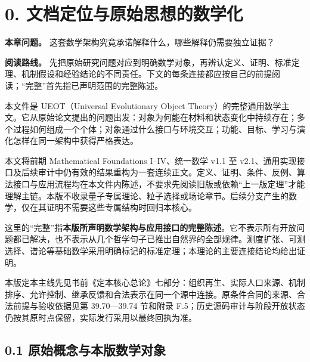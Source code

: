 \documentclass[
  11pt,
  oneside]{book}
\begin{document}
\chapter{0. 文档定位与原始思想的数学化}\label{ch-0}

\textbf{本章问题。} 这套数学架构究竟承诺解释什么，哪些解释仍需要独立证据？

\textbf{阅读路线。} 先把原始研究问题对应到明确数学对象，再辨认定义、证明、标准定理、机制假设和经验结论的不同责任。下文的每条连接都应按自己的前提阅读；``完整''首先指已声明范围的完整陈述。

本文件是 UEOT（Universal Evolutionary Object Theory）的完整通用数学主文。它从原始论文提出的问题出发：对象为何能在材料和状态变化中持续存在；多个过程如何组成一个个体；对象通过什么接口与环境交互；功能、目标、学习与演化怎样在同一架构中获得严格表达。

本文将前期 Mathematical Foundations I--IV、统一数学 v1.1 至 v2.1、通用实现接口及后续审计中仍有效的结果重构为一套连续正文。定义、证明、条件、反例、算法接口与应用流程均在本文件内陈述，不要求先阅读旧版或依赖``上一版定理''才能理解主链。本版不收录量子专属理论、粒子选择或场论章节。后续分支产生的数学，仅在其证明不需要这些专属结构时回归本核心。

这里的``完整''指\textbf{本版所声明数学架构与应用接口的完整陈述}。它不表示所有开放问题都已解决，也不表示从几个哲学句子已推出自然界的全部规律。测度扩张、可测选择、谱论等基础数学采用明确标记的标准定理；本理论的主要连接结论均给出证明。

本版定本主线先见书前《定本核心总论》七部分：组织再生、实际人口来源、机制排序、允许控制、继承反馈和合法表示在同一个源中连接。原条件合同的来源、合法前提与验收依据见第 39.70---39.74 节和附录 F.5；历史源码审计与阶段开放状态仍按其原时点保留，实际发行采用以最终回执为准。

\section{0.1 原始概念与本版数学对象}\label{ux539fux59cbux6982ux5ff5ux4e0eux672cux7248ux6570ux5b66ux5bf9ux8c61}
\end{document}
